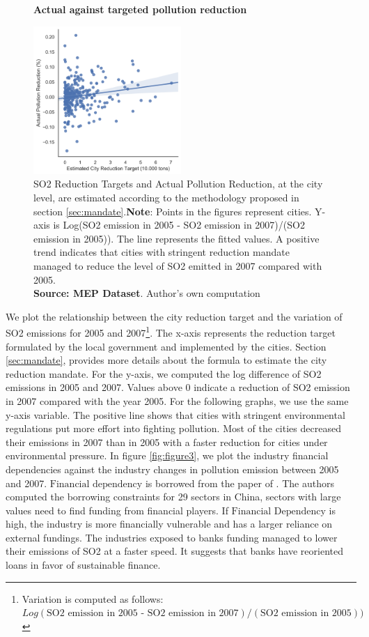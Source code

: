 \documentclass[12pt]{article}
\begin{document}
\begin{figure}[ht]
    \centering
    \textbf{Actual against targeted pollution reduction}\par\medskip
    \includegraphics[width=0.5\textwidth]{fig_2}
    \caption{SO2 Reduction Targets and Actual Pollution Reduction, at the city level, are estimated according to the methodology proposed in section \ref{sec:mandate}.\textbf{Note}: Points in the figures represent cities. Y-axis is Log(SO2 emission in 2005 - SO2 emission in 2007)/(SO2 emission in 2005)). The line represents the fitted values. A positive trend indicates that cities with stringent reduction mandate managed to reduce the level of SO2 emitted in 2007 compared with 2005. \\
    \textbf{Source: MEP Dataset}. Author's own computation}
    \label{fig:figure2}
\end{figure}

We plot the relationship between the city reduction target and the variation of SO2 emissions for 2005 and 2007\footnote{Variation is computed as follows: $Log(\text{SO2 emission in 2005 - SO2 emission in 2007})/(\text{SO2 emission in 2005}))$}. The x-axis represents the reduction target formulated by the local government and implemented by the cities. Section \ref{sec:mandate}, provides more details about the formula to estimate the city reduction mandate. For the y-axis, we computed the log difference of SO2 emissions in 2005 and 2007. Values above 0 indicate a reduction of SO2 emission in 2007 compared with the year 2005. For the following graphs, we use the same y-axis variable. The positive line shows that cities with stringent environmental regulations put more effort into fighting pollution. Most of the cities decreased their emissions in 2007 than in 2005 with a faster reduction for cities under environmental pressure. In figure \ref{fig:figure3}, we plot the industry financial dependencies against the industry changes in pollution emission between 2005 and 2007. $\text{Financial dependency}$ is borrowed from the paper of \cite{Fan2015-bm}. The authors computed the borrowing constraints for 29 sectors in China, sectors with large values need to find funding from financial players. If $\text{Financial Dependency}$ is high, the industry is more financially vulnerable and has a larger reliance on external fundings. The industries exposed to banks funding managed to lower their emissions of SO2 at a faster speed. It suggests that banks have reoriented loans in favor of sustainable finance. 
\end{document}
